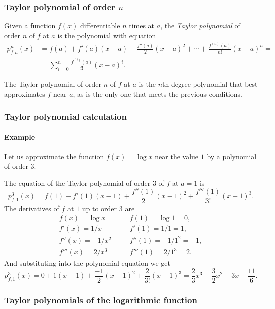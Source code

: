 \begin{frame}
\frametitle{Taylor polynomial of order $n$}
\begin{definition}
Given a function $f(x)$ differentiable $n$ times at $a$, the \emph{Taylor polynomial} of order $n$ of $f$ at $a$ is the polynomial with equation
\begin{align*}
p_{f,a}^n(x) &= f(a) + f'(a)(x-a) + \frac{f''(a)}{2}(x-a)^2 + \cdots + \frac{f^{(n)}(a)}{n!}(x-a)^n = \\ 
&= \sum_{i=0}^{n}\frac{f^{(i)}(a)}{i!}(x-a)^i.
\end{align*}
\end{definition}

The Taylor polynomial of order $n$ of $f$ at $a$ is the $n$th degree polynomial that best approximates $f$ near $a$, as is the only one that meets the previous conditions.
\end{frame} 


\begin{frame}
\frametitle{Taylor polynomial calculation}
\framesubtitle{Example}
Let us approximate the function $f(x)=\log x$ near the value $1$ by a polynomial of order $3$.

The equation of the Taylor polynomial of order $3$ of $f$ at $a=1$ is
\[
p_{f,1}^3(x)=f(1)+f'(1)(x-1)+\frac{f''(1)}{2}(x-1)^2+\frac{f'''(1)}{3!}(x-1)^3.
\]
The derivatives of $f$ at $1$ up to order $3$ are
\[
\begin{array}{lll}
f(x)=\log x & \quad & f(1)=\log 1 =0,\\
f'(x)=1/x & & f'(1)=1/1=1,\\
f''(x)=-1/x^2 & & f''(1)=-1/1^2=-1,\\
f'''(x)=2/x^3 & & f'''(1)=2/1^3=2.
\end{array}
\]
And substituting into the polynomial equation we get
\[
p_{f,1}^3(x)=0+1(x-1)+\frac{-1}{2}(x-1)^2+\frac{2}{3!}(x-1)^3= \frac{2}{3}x^3-\frac{3}{2}x^2+3x-\frac{11}{6}.
\]
\end{frame}


\begin{frame}
\frametitle{Taylor polynomials of the logarithmic function}
\begin{center}

\end{center}
\end{frame}


